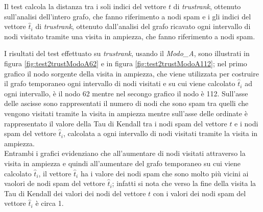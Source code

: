 Il test calcola la distanza tra i soli indici del vettore \(t\) di \textit{trustrank}, ottenuto sull'analisi dell'intero grafo, che fanno riferimento a nodi spam e i gli indici del vettore \(\hat{t}_i\) di \textit{trustrank}, ottenuto dall'analisi del grafo ricavato ogni intervallo di nodi visitato tramite una visita in ampiezza, che fanno riferimento a nodi spam.

I risultati del test effettuato su \textit{trustrank}, usando il \textit{Modo\_A}, sono illustrati in figura \ref{fig:test2trustModoA62} e in figura \ref{fig:test2trustModoA112}; nel primo grafico il nodo sorgente della visita in ampiezza, che viene utilizzata per costruire il grafo temporaneo ogni intervallo di nodi visitati e su cui viene calcolato \(\hat{t}_i\) ad ogni intervallo, è il nodo 62 mentre nel secongo grafico il nodo è 112.  Sull'asse delle ascisse sono rappresentati il numero di nodi che sono spam tra quelli che vengono visitati tramite la visita in ampiezza mentre sull'asse delle ordinate è rappresentato il valore della Tau di Kendall tra i nodi spam del vettore \(t\) e i nodi spam del vettore \(\hat{t}_i\), calcolata a ogni intervallo di nodi visitati tramite la visita in ampiezza.\\
Entrambi i grafici evidenziano che all'aumentare di nodi visitati attraverso la visita in ampiezza e quindi all'aumentare del grafo temporaneo su cui viene calcolato \(\hat{t}_i\), il vettore \(\hat{t}_i\) ha i valore dei nodi spam che sono molto più vicini ai vaolori de nodi spam del vettore \(\hat{t}_i\); infatti si nota che verso la fine della visita la Tau di Kendall dei valori dei nodi del vettore \(t\) con i valori dei nodi spam del vettore \(\hat{t}_i\) è circa 1. 

